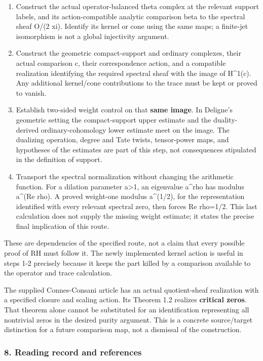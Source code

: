 \begin{enumerate}
\def\labelenumi{\arabic{enumi}.}
\tightlist
\item
  Construct the actual operator-balanced theta complex at the relevant support labels, and its
  action-compatible analytic comparison beta to the spectral sheaf O/(2 xi). Identify its kernel or
  cone using the same maps; a finite-jet isomorphism is not a global injectivity argument.
\item
  Construct the geometric compact-support and ordinary complexes, their actual comparison c, their
  correspondence action, and a compatible realization identifying the required spectral sheaf with
  the image of H\^{}1(c). Any additional kernel/cone contributions to the trace must be kept or
  proved to vanish.
\item
  Establish two-sided weight control on that \textbf{same image}. In Deligne's geometric setting the
  compact-support upper estimate and the duality-derived ordinary-cohomology lower estimate meet on
  the image. The dualizing operation, degree and Tate twists, tensor-power maps, and hypotheses of
  the estimates are part of this step, not consequences stipulated in the definition of support.
\item
  Transport the spectral normalization without changing the arithmetic function. For a dilation
  parameter a\textgreater1, an eigenvalue a\^{}rho has modulus a\^{}(Re rho). A proved weight-one
  modulus a\^{}(1/2), for the representation identified with every relevant spectral zero, then
  forces Re rho=1/2. This last calculation does not supply the missing weight estimate; it states
  the precise final implication of this route.
\end{enumerate}

These are dependencies of the specified route, not a claim that every possible proof of RH must
follow it. The newly implemented kernel action is useful in steps 1-2 precisely because it keeps the
part killed by a comparison available to the operator and trace calculation.

The supplied Connes-Consani article has an actual quotient-sheaf realization with a specified
closure and scaling action. Its Theorem 1.2 realizes \textbf{critical zeros}. That theorem alone
cannot be substituted for an identification representing all nontrivial zeros in the desired purity
argument. This is a concrete source/target distinction for a future comparison map, not a dismissal
of the construction.

\subsubsection{8. Reading record and references}\label{derived_main:reading-record-and-references}

